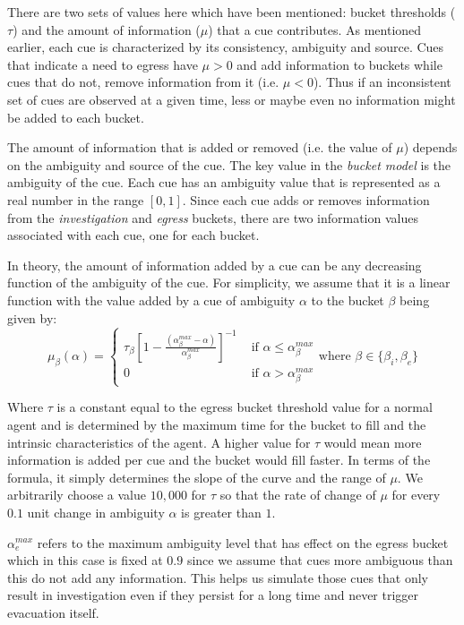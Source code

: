 There are two sets of values here which have been mentioned: bucket thresholds ($\tau$) and the amount of information ($\mu$) that a cue contributes. As mentioned earlier, each cue is characterized by its consistency, ambiguity and source. Cues that indicate a need to egress have $\mu > 0$ and add information to buckets while cues that do not, remove information from it (i.e. $\mu<0$). Thus if an inconsistent set of cues are observed at a given time, less or maybe even no information might be added to each bucket.

The amount of information that is added or removed (i.e. the value of $\mu$) depends on the ambiguity and source of the cue. The key value in the \emph{bucket model} is the ambiguity of the cue. Each cue has an ambiguity value that is represented as a real number in the range $[0,1]$. Since each cue adds or removes information from the \emph{investigation} and \emph{egress} buckets, there are two information values associated with each cue, one for each bucket.

In theory, the amount of information added by a cue can be any decreasing function of the ambiguity of the cue. For simplicity, we assume that it is a linear function with the value added by a cue of ambiguity $\alpha$ to the bucket $\beta$ being given by:
\begin{equation}
	\mu_{\beta} (\alpha) =
    \begin{cases}

        {\tau_{\beta}}{\left[1-\frac{(\alpha^{max}_{\beta}-\alpha)}{\alpha^{max}_{\beta}}\right]}^{-1} & \mbox{ if } \alpha \leq \alpha^{max}_{\beta}\\
        0 & \mbox{ if } \alpha > \alpha^{max}_{\beta}
    \end{cases} \mbox{where } \beta \in \{\beta_{i}, \beta_{e}\}
\end{equation}

Where $\tau$ is a constant equal to the egress bucket threshold value for a normal agent and is determined by the maximum time for the bucket to fill and the intrinsic characteristics of the agent. A higher value for $\tau$ would mean more information is added per cue and the bucket would fill faster. In terms of the formula, it simply determines the slope of the curve and the range of $\mu$.  We arbitrarily choose a value $10,000$ for $\tau$ so that the rate of change of $\mu$ for every $0.1$ unit change in ambiguity $\alpha$ is greater than $1$.

$\alpha^{max}_{e}$ refers to the maximum ambiguity level that has effect on the egress bucket which in this case is fixed at $0.9$ since we assume that cues more ambiguous than this do not add any information. This helps us simulate those cues that only result in investigation even if they persist for a long time and never trigger evacuation itself. %


